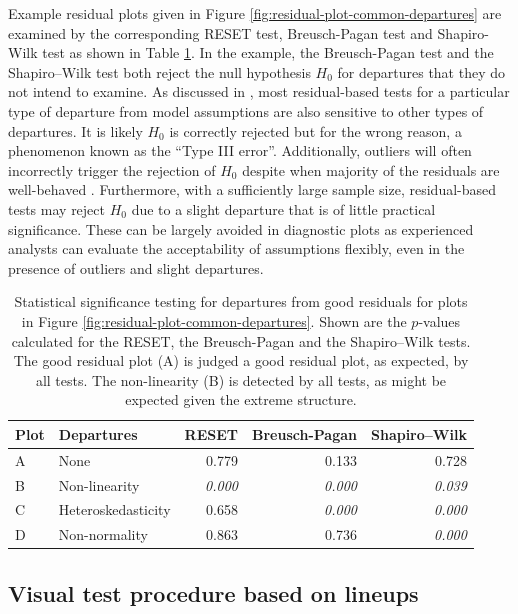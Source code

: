 \documentclass[]{interact}
\theoremstyle{plain}%
\theoremstyle{definition}
\theoremstyle{remark}
\begin{document}
Example residual plots given in Figure
\ref{fig:residual-plot-common-departures} are examined by the
corresponding RESET test, Breusch-Pagan test and Shapiro-Wilk test as
shown in Table \ref{tab:example-residual-plot-table}. In the example,
the Breusch-Pagan test and the Shapiro--Wilk test both reject the null
hypothesis \(H_0\) for departures that they do not intend to examine. As
discussed in \citet{cook1982residuals}, most residual-based tests for a
particular type of departure from model assumptions are also sensitive
to other types of departures. It is likely \(H_0\) is correctly rejected
but for the wrong reason, a phenomenon known as the ``Type III error''.
Additionally, outliers will often incorrectly trigger the rejection of
\(H_0\) despite when majority of the residuals are well-behaved
\citep{cook_applied_1999}. Furthermore, with a sufficiently large sample
size, residual-based tests may reject \(H_0\) due to a slight departure
that is of little practical significance. These can be largely avoided
in diagnostic plots as experienced analysts can evaluate the
acceptability of assumptions flexibly, even in the presence of outliers
and slight departures.

\begin{table}

\caption{\label{tab:example-residual-plot-table}Statistical significance testing for departures from good residuals for plots in Figure \ref{fig:residual-plot-common-departures}. Shown are the $p$-values calculated for the RESET, the Breusch-Pagan and the Shapiro–Wilk tests. The good residual plot (A) is judged a good residual plot, as expected, by all tests. The non-linearity (B) is detected by all tests, as might be expected given the extreme structure.}
\centering
\begin{tabular}[t]{llrrr}
\toprule
Plot & Departures & RESET & Breusch-Pagan & Shapiro–Wilk\\
\midrule
A & None & 0.779 & 0.133 & 0.728\\
B & Non-linearity & \em{0.000} & \em{0.000} & \em{0.039}\\
C & Heteroskedasticity & 0.658 & \em{0.000} & \em{0.000}\\
D & Non-normality & 0.863 & 0.736 & \em{0.000}\\
\bottomrule
\end{tabular}
\end{table}

\hypertarget{visual-test-procedure-based-on-lineups}{%
\subsection{Visual test procedure based on
lineups}\label{visual-test-procedure-based-on-lineups}}
\end{document}
